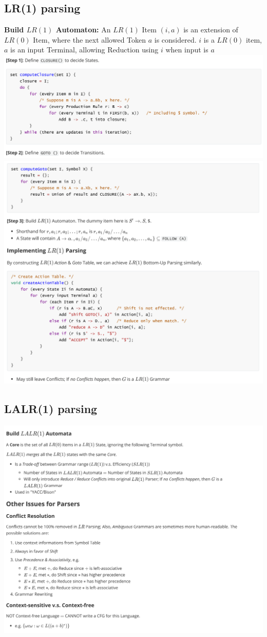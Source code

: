 \documentclass[a4paper]{article}
\theoremstyle{definition}
\begin{document}
\subsection {LR(1) parsing}
\textbf{Build $L R(1)$ Automaton:}
An $L R(1)$ Item $(i, a)$ is an extension of $L R(0)$ Item, where the next allowed Token $a$ is considered.
$i$ is a $L R(0)$ item, $a$ is an input Terminal, allowing Reduction using $i$ when input is $a$
\includegraphics[width=15cm]{img/Snipaste_2021-04-19_17-56-00.png}\\
\includegraphics[width=15cm]{img/Snipaste_2021-04-19_17-56-46.png}
\subsection {LALR(1) parsing}
\includegraphics[width=15cm]{img/Snipaste_2021-04-19_17-57-34.png}
\end{document}
